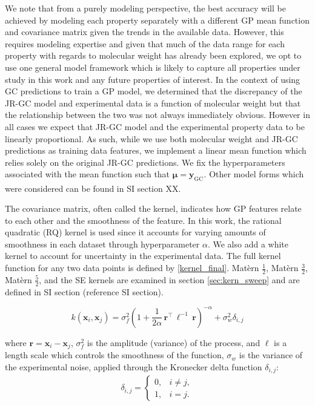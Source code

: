 \documentclass[journal=jacsat,manuscript=article]{achemso}
\newcommand{\xvec}{\ensuremath{\mathbf{x}}}
\newcommand{\Ygcvec}[1][]{\ensuremath{\mathbf{y}_{\text{GC}_{#1}}}}
\begin{document}
{We note that from a purely modeling perspective, the best accuracy will be achieved by modeling each property separately with a different GP mean function and covariance matrix given the trends in the available data. However, this requires modeling expertise and given that much of the data range for each property with regards to molecular weight has already been explored, we opt to use one general model framework which is likely to capture all properties under study in this work and any future properties of interest. In the context of using GC predictions to train a GP model, we determined that the discrepancy of the JR-GC model and experimental data is a function of molecular weight but that the relationship between the two was not always immediately obvious. However in all cases we expect that JR-GC model and the experimental property data to be linearly proportional. As such, while we use both molecular weight and JR-GC predictions as training data features, we implement a linear mean function which relies solely on the original JR-GC predictions. We fix the hyperparameters associated with the mean function such that $\boldsymbol{\mu} = \Ygcvec$.  Other model forms which were considered can be found in SI section XX. 

The covariance matrix, often called the kernel, indicates how GP features relate to each other and the smoothness of the feature. In this work, the rational quadratic (RQ) kernel is used since it accounts for varying amounts of smoothness in each dataset through hyperparameter $\alpha$. We also add a white kernel to account for uncertainty in the experimental data. The full kernel function for any two data points is defined by \eqref{kernel_final}. Mat\`ern $\frac{1}{2}$, Mat\`ern $\frac{3}{2}$, Mat\`ern $\frac{5}{2}$, and the SE kernels are examined in section \ref{sec:kern_sweep} and are defined in SI section (reference SI section).

\begin{equation}
    k(\xvec_i,\xvec_j) = \sigma_f^2 \left(1 +\frac{1}{2 \alpha} \,\mathbf{r}^\intercal \,{\ell}^{-1} \,\mathbf{r} \right)^{-\alpha} + \sigma_w^2\delta_{i,j}
    \label{kernel_final}
\end{equation}

\noindent where  $\mathbf{r} = \xvec_i - \xvec_j$, $\sigma_f^2$ is the amplitude (variance) of the process, and $\ell$ is a length scale which controls the smoothness of the function, $\sigma_w$ is the variance of the experimental noise, applied through the Kronecker delta function $\delta_{i,j}$:
\begin{gather*}
    \delta_{i,j} = 
    \begin{cases}
        0, & i\neq j,\\
        1, & i= j.
    \end{cases}
\end{gather*}

}
\end{document}
